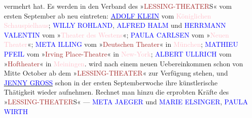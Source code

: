                vermehrt hat. Es werden in den Verband des »\textcolor{brown}{LESSING-THEATER}{}\ledrightnote{\textcolor{brown}{Lessing-Theater}}S« vom ersten September ab neu eintreten: \uline{\textcolor{blue}{ADOLF KLEIN}{}\ledrightnote{\textcolor{blue}{Adolf Klein}}} vom \textcolor{pink}{Königlichen Schauspielhaus}{}\ledrightnote{\textcolor{pink}{Schauspielhaus}}; \textcolor{blue}{WILLY ROHLAND}{}\ledrightnote{\textcolor{blue}{Willy Rohland}}, \textcolor{blue}{ALFRED HALM}{}\ledrightnote{\textcolor{blue}{Alfred Halm}} und \textcolor{blue}{HERRMANN VALENTIN}{}\ledrightnote{\textcolor{blue}{Hermann Vallentin}} vom »\textcolor{pink}{Theater des Westens}{}\ledrightnote{\textcolor{pink}{Theater des Westens}}«; \textcolor{blue}{PAULA CARLSEN}{}\ledrightnote{\textcolor{blue}{Paula Carlsen}} vom »\textcolor{pink}{Neuen Theater}{}\ledrightnote{\textcolor{pink}{Neues Theater}}«; \textcolor{blue}{META ILLING}{}\ledrightnote{\textcolor{blue}{Meta Illing}} vom »\textcolor{brown}{Deutschen Theater}{}\ledrightnote{\textcolor{brown}{Deutsches Theater München}}« in \textcolor{pink}{München}{}\ledrightnote{\textcolor{pink}{München}}; \textcolor{blue}{MATHIEU PFEIL}{}\ledrightnote{\textcolor{blue}{Mathieu Pfeil}} vom »\textcolor{brown}{Irving Place-Theatre}{}\ledrightnote{\textcolor{brown}{Irving Place Theatre}}« in \textcolor{pink}{New-York}{}\ledrightnote{\textcolor{pink}{New York City}}; \textcolor{blue}{ALBERT ULLRICH}{}\ledrightnote{\textcolor{blue}{Albert Ullrich}} vom »\textcolor{brown}{Hoftheater}{}\ledrightnote{\textcolor{brown}{Hoftheater Meiningen}}« in \textcolor{pink}{Meiningen}{}\ledrightnote{\textcolor{pink}{Meiningen}}. \uline{\textcolor{blue}{\label{T_L00676-1v}\label{T_L00676-1h}}{}\ledrightnote{\textcolor{blue}{Louise Dumont}}} wird nach einem neuen Uebereinkommen schon von Mitte October ab dem »\textcolor{brown}{LESSING-THEATER}{}\ledrightnote{\textcolor{brown}{Lessing-Theater}}« zur Verfügung stehen, und \uline{\textcolor{blue}{JENNY GROSS}{}\ledrightnote{\textcolor{blue}{Jenny Groß}}} schon in der ersten {\pb}Septemberwoche
               ihre künstlerische Thätigkeit wieder aufnehmen. Rechnet man hinzu die erprobten
               Kräfte des »\textcolor{brown}{LESSING-THEATER}{}\ledrightnote{\textcolor{brown}{Lessing-Theater}}S« — \textcolor{blue}{META JAEGER}{}\ledrightnote{\textcolor{blue}{Meta Jaeger}} und \textcolor{blue}{MARIE ELSINGER}{}\ledrightnote{\textcolor{blue}{Marie Elsinger}}, \textcolor{blue}{PAULA WIRTH}{}\ledrightnote{\textcolor{blue}{Paula Wirth}}
